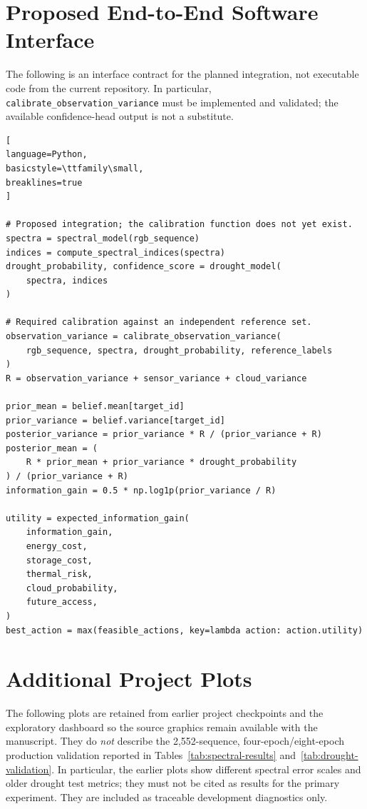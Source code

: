 \documentclass[11pt,a4paper]{article}
\begin{document}
\section{Proposed End-to-End Software Interface}

The following is an interface contract for the planned integration,
not executable code from the current repository. In particular,
\texttt{calibrate\_observation\_variance} must be implemented and
validated; the available confidence-head output is not a substitute.

\begin{lstlisting}[
language=Python,
basicstyle=\ttfamily\small,
breaklines=true
]

# Proposed integration; the calibration function does not yet exist.
spectra = spectral_model(rgb_sequence)
indices = compute_spectral_indices(spectra)
drought_probability, confidence_score = drought_model(
    spectra, indices
)

# Required calibration against an independent reference set.
observation_variance = calibrate_observation_variance(
    rgb_sequence, spectra, drought_probability, reference_labels
)
R = observation_variance + sensor_variance + cloud_variance

prior_mean = belief.mean[target_id]
prior_variance = belief.variance[target_id]
posterior_variance = prior_variance * R / (prior_variance + R)
posterior_mean = (
    R * prior_mean + prior_variance * drought_probability
) / (prior_variance + R)
information_gain = 0.5 * np.log1p(prior_variance / R)

utility = expected_information_gain(
    information_gain,
    energy_cost,
    storage_cost,
    thermal_risk,
    cloud_probability,
    future_access,
)
best_action = max(feasible_actions, key=lambda action: action.utility)

\end{lstlisting}


\section{Additional Project Plots}

The following plots are retained from earlier project checkpoints and
the exploratory dashboard so the source graphics remain available
with the manuscript. They do \emph{not} describe the 2,552-sequence,
four-epoch/eight-epoch production validation reported in
Tables~\ref{tab:spectral-results} and~\ref{tab:drought-validation}.
In particular, the earlier plots show different spectral error scales
and older drought test metrics; they must not be cited as results for
the primary experiment. They are included as traceable development
diagnostics only.
\end{document}
